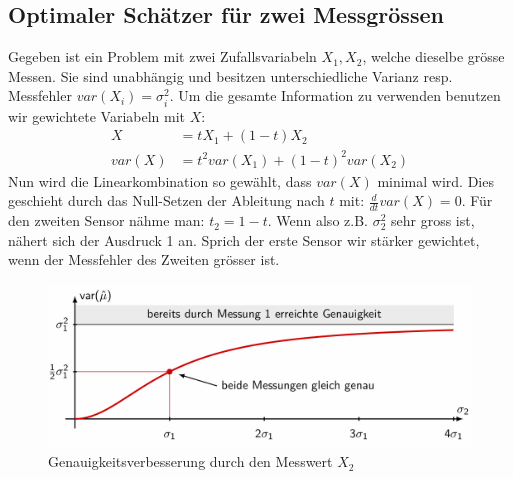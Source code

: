 \documentclass[../Main.tex]{subfiles}
\begin{document}
\subsection{Optimaler Schätzer für zwei Messgrössen}
Gegeben ist ein Problem mit zwei Zufallsvariabeln
\(X_1,X_2\), welche dieselbe grösse Messen.
Sie sind unabhängig und besitzen unterschiedliche
Varianz resp. Messfehler \(var(X_i)=\sigma_i^2\).
Um die gesamte Information zu verwenden benutzen
wir gewichtete Variabeln mit \(X\):
\begin{equation}
    \begin{split}
        X &= tX_1+(1-t)X_2 \\
        var(X) &= t^2var(X_1) + (1-t)^2var(X_2)
    \end{split}
\end{equation}
Nun wird die Linearkombination so gewählt,
dass \(var(X)\) minimal wird.
Dies geschieht durch das Null-Setzen der Ableitung nach \(t\) mit: \(\frac{d}{dt}var(X)=0\).
Für den zweiten Sensor nähme man: \(t_2 = 1-t\).
Wenn also z.B. \(\sigma_2^2\) sehr gross ist, nähert
sich der Ausdruck 1 an. Sprich der erste Sensor
wir stärker gewichtet, wenn der Messfehler des Zweiten grösser ist.


\begin{figure}[H]
    \centering
    \includegraphics[width=1\linewidth]{Images/verbesserung-genauigkeit-filter.png}
    \caption{Genauigkeitsverbesserung durch den Messwert \(X_2\)}
\end{figure}
\newpage
\end{document}
